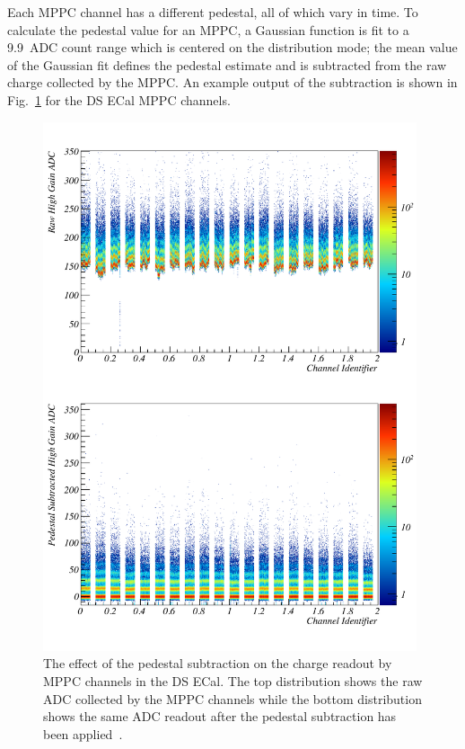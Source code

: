 {\newline
Each MPPC channel has a different pedestal, all of which vary in time.  To calculate the pedestal value for an MPPC, a Gaussian function is fit to a 9.9~ADC count range which is centered on the distribution mode; the mean value of the Gaussian fit defines the pedestal estimate and is subtracted from the raw charge collected by the MPPC.  An example output of the subtraction is shown in Fig.~\ref{fig:DSECalPedestalSubtraction} for the DS ECal MPPC channels.
\begin{figure}[t!]
  \centering
  \includegraphics[width=11cm]{images/software/DSECal_Pedestal_Subtraction.pdf}
  \caption{The effect of the pedestal subtraction on the charge readout by MPPC channels in the DS ECal.  The top distribution shows the raw ADC collected by the MPPC channels while the bottom distribution shows the same ADC readout after the pedestal subtraction has been applied~\cite{ND280CalibTN}.}
  \label{fig:DSECalPedestalSubtraction}
\end{figure}
\newline
\newline
}
